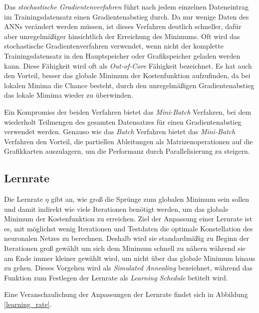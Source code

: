 Das \textit{stochastische Gradientenverfahren} führt nach jedem einzelnen Dateneintrag im Trainingsdatensatz einen Gradientenabstieg durch. Da nur wenige Daten des ANNs verändert werden müssen, ist dieses Verfahren deutlich schneller, dafür aber unregelmäßiger hinsichtlich der Erreichung des Minimums. Oft wird das stochastische Gradientenverfahren verwendet, wenn nicht der komplette Trainingsdatensatz in den Hauptspeicher oder Grafikspeicher geladen werden kann. Diese Fähigkeit wird oft als \textit{Out-of-Core} Fähigkeit bezeichnet. Es hat auch den Vorteil, besser das globale Minimum der Kostenfunktion aufzufinden, da bei lokalen Minima die Chance besteht, durch den unregelmäßigen Gradientenabstieg das lokale Mimima wieder zu überwinden. \cite[S. 118 f.]{AurelienGeron.2018}

Ein Kompromiss der beiden Verfahren bietet das \textit{Mini-Batch} Verfahren, bei dem wiederholt Teilmengen des gesamten Datensatzes für einen Gradientenabstieg verwendet werden. Genauso wie das \textit{Batch} Verfahren bietet das \textit{Mini-Batch} Verfahren den Vorteil, die partiellen Ableitungen als Matrizenoperationen auf die Grafikkarten auszulagern, um die Performanz durch Parallelisierung zu steigern. \cite[S. 121]{AurelienGeron.2018}

\subsection*{Lernrate}

Die Lernrate $\eta$ gibt an, wie groß die Sprünge zum globalen Minimum sein sollen und damit indirekt wie viele Iterationen benötigt werden, um das globale Minimum der Kostenfunktion zu erreichen. Ziel der Anpassung einer Lernrate ist es, mit möglichst wenig Iterationen und Testdaten die optimale Konstellation des neuronalen Netzes zu berechnen. Deshalb wird sie standardmäßig zu Beginn der Iterationen groß gewählt um sich dem Minimum schnell zu nähern während sie am Ende immer kleiner gewählt wird, um nicht über das globale Minimum hinaus zu gehen. Dieses Vorgehen wird als \textit{Simulated Annealing} bezeichnet, während das Funktion zum Festlegen der Lernrate als \textit{Learning Schedule} betitelt wird. \cite[S. 113f]{AurelienGeron.2018}

Eine Veranschaulichung der Anpassungen der Lernrate findet sich in Abbildung \ref{learning_rate}.

